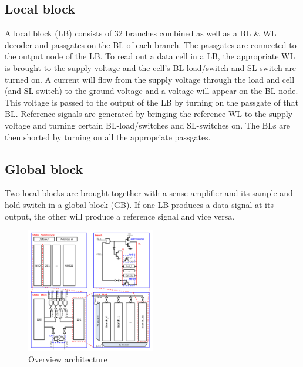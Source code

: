 \documentclass[journal]{IEEEtran}
\begin{document}
\subsection{Local block}
A local block (LB) consists of 32 branches combined as well as a BL \& WL decoder and passgates on the BL of each branch. The passgates are connected to the output node of the LB. To read out a data cell in a LB, the appropriate WL is brought to the supply voltage and the cell's BL-load/switch and SL-switch are turned on. A current will flow from the supply voltage through the load and cell (and SL-switch) to the ground voltage and a voltage will appear on the BL node. This voltage is passed to the output of the LB by turning on the passgate of that BL. Reference signals are generated by bringing the reference WL to the supply voltage and turning certain BL-load/switches and SL-switches on. The BLs are then shorted by turning on all the appropriate passgates.

\subsection{Global block} 
Two local blocks are brought together with a sense amplifier and its sample-and-hold switch in a global block (GB). If one LB produces a data signal at its output, the other will produce a reference signal and vice versa. 

\begin{figure}[ht!]
  \centering
  \includegraphics[width=0.5\textwidth]{../fig/paper-architecture.png}
  \caption{Overview architecture}
  \label{fig:architecture}
\end{figure}
\end{document}
